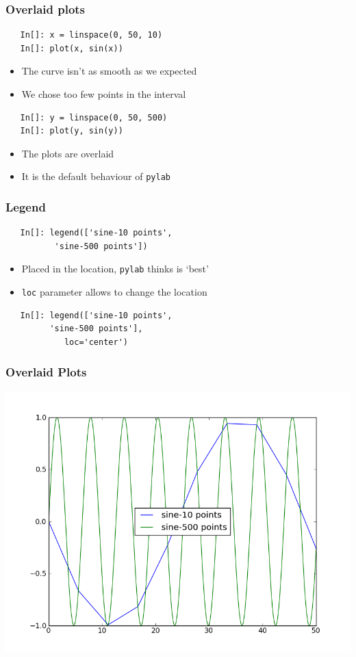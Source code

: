 \begin{frame}[fragile]
  \frametitle{Overlaid plots}
  \begin{lstlisting}
   In[]: x = linspace(0, 50, 10)
   In[]: plot(x, sin(x))
  \end{lstlisting}
  \begin{itemize}
  \item The curve isn't as smooth as we expected
  \item We chose too few points in the interval
  \end{itemize}
  \begin{lstlisting}
   In[]: y = linspace(0, 50, 500)
   In[]: plot(y, sin(y))
  \end{lstlisting}
  \begin{itemize}
  \item The plots are overlaid
  \item It is the default behaviour of \texttt{pylab}
  \end{itemize}
\end{frame}

\begin{frame}[fragile]
  \frametitle{Legend}
  \begin{lstlisting}
   In[]: legend(['sine-10 points',
          'sine-500 points'])
  \end{lstlisting}
  \begin{itemize}
  \item Placed in the location, \texttt{pylab} thinks is `best'
  \item \texttt{loc} parameter allows to change the location
  \end{itemize}
  \begin{lstlisting}
   In[]: legend(['sine-10 points',
         'sine-500 points'], 
            loc='center')
  \end{lstlisting}
\end{frame}

\begin{frame}
\frametitle{Overlaid Plots}
\includegraphics[scale=0.45]{../advanced_python/images/overlaid.png}\\
\end{frame}



